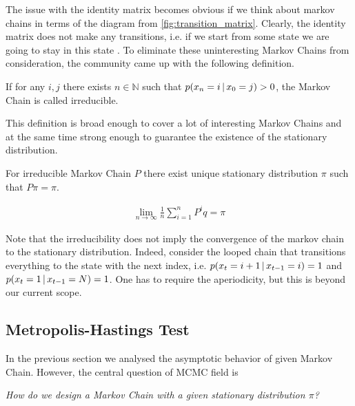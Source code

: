 The issue with the identity matrix becomes obvious if we think about markov chains in terms of the diagram from \cref{fig:transition_matrix}. Clearly, the identity matrix does not make any transitions, i.e. if we start from some state we are going to stay in this state . To eliminate these uninteresting Markov Chains from consideration, the community came up with the following definition.
\begin{mybox}
\begin{definition}[Irreducibility]
    If for any $i,j$ there exists $n \in \mathbb{N}$ such that $p(x_n=i\,|\, x_0=j) > 0$, the Markov Chain is called irreducible.
\end{definition}
\end{mybox}
This definition is broad enough to cover a lot of interesting Markov Chains and at the same time strong enough to guarantee the existence of the stationary distribution.
\begin{theorem}
    For irreducible Markov Chain $P$ there exist unique stationary distribution $\pi$ such that $P\pi = \pi$.
\end{theorem}

\begin{theorem}
    \begin{align}
    \lim_{n\to\infty}\frac{1}{n}\sum_{i=1}^n P^i q = \pi
    \end{align}
\end{theorem}

Note that the irreducibility does not imply the convergence of the markov chain to the stationary distribution. Indeed, consider the looped chain that transitions everything to the state with the next index, i.e. $p(x_t=i+1\,|\, x_{t-1}=i)=1$ and $p(x_t=1\,|\, x_{t-1}=N)=1$. One has to require the aperiodicity, but this is beyond our current scope.

\subsection{Metropolis-Hastings Test}

In the previous section we analysed the asymptotic behavior of given Markov Chain. However, the central question of MCMC field is
\begin{mybox}
    \begin{center}
        \textit{How do we design a Markov Chain with a given stationary distribution $\pi$?}
    \end{center}
\end{mybox}

